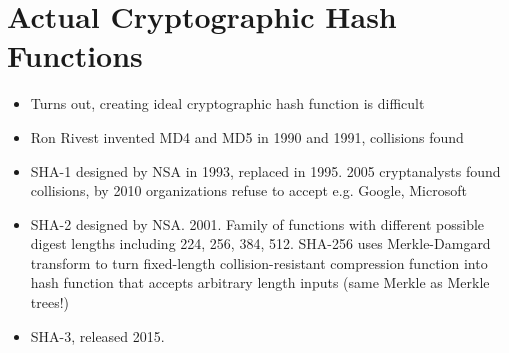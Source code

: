\documentclass{article}
\begin{document}
\section{Actual Cryptographic Hash Functions}
\begin{itemize}
\item Turns out, creating ideal cryptographic hash function is difficult
\item Ron Rivest invented MD4 and MD5 in 1990 and 1991, collisions found
\item SHA-1 designed by NSA in 1993, replaced in 1995. 2005 cryptanalysts found collisions, by 2010 organizations refuse to accept e.g. Google, Microsoft
\item SHA-2 designed by NSA. 2001. Family of functions with different possible digest lengths including 224, 256, 384, 512.
\subitem SHA-256 uses Merkle-Damgard transform to turn fixed-length collision-resistant compression function into hash function that accepts arbitrary length inputs (same Merkle as Merkle trees!)
\item SHA-3, released 2015.
\end{itemize}
\end{document}
